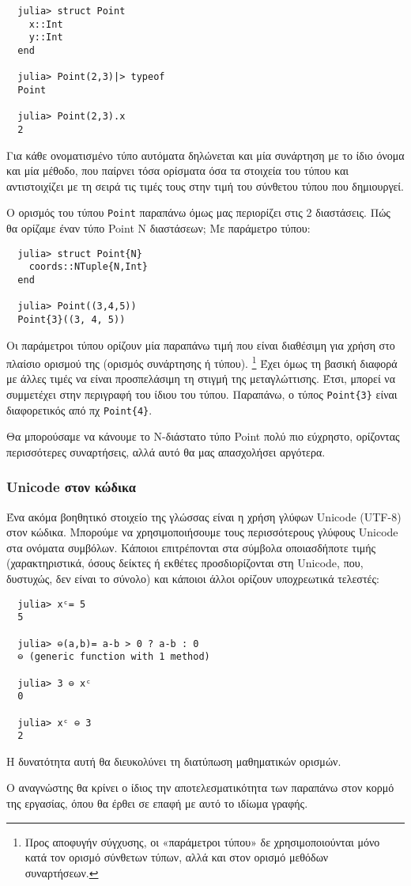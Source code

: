   \begin{verbatim}
  julia> struct Point
    x::Int
    y::Int
  end

  julia> Point(2,3)|> typeof
  Point

  julia> Point(2,3).x
  2
  \end{verbatim}

  Για κάθε ονοματισμένο τύπο αυτόματα δηλώνεται και μία συνάρτηση με το ίδιο όνομα και μία μέθοδο,
  που παίρνει τόσα ορίσματα όσα τα στοιχεία του τύπου και αντιστοιχίζει με τη σειρά τις τιμές τους στην τιμή του σύνθετου τύπου που δημιουργεί.

  Ο ορισμός του τύπου \verb|Point| παραπάνω όμως μας περιορίζει στις 2 διαστάσεις.
  Πώς θα ορίζαμε έναν τύπο Point Ν διαστάσεων; Με παράμετρο τύπου:

  \begin{verbatim}
  julia> struct Point{N}
    coords::NTuple{N,Int}
  end

  julia> Point((3,4,5))
  Point{3}((3, 4, 5))
  \end{verbatim}

  Οι παράμετροι τύπου ορίζουν μία παραπάνω τιμή που είναι διαθέσιμη για χρήση στο πλαίσιο ορισμού της (ορισμός συνάρτησης ή τύπου).
  \footnote{Προς αποφυγήν σύγχυσης, οι «παράμετροι τύπου» δε χρησιμοποιούνται μόνο
  κατά τον ορισμό σύνθετων τύπων, αλλά και στον ορισμό μεθόδων συναρτήσεων.}
  Έχει όμως τη βασική διαφορά με άλλες τιμές να είναι προσπελάσιμη τη στιγμή της μεταγλώττισης.
  Έτσι, μπορεί να συμμετέχει στην περιγραφή του ίδιου του τύπου.
  Παραπάνω, ο τύπος \verb|Point{3}| είναι διαφορετικός από πχ \verb|Point{4}|.

  Θα μπορούσαμε να κάνουμε το Ν-διάστατο τύπο Point πολύ πιο εύχρηστο, ορίζοντας περισσότερες συναρτήσεις,
  αλλά αυτό θα μας απασχολήσει αργότερα.

  \subsubsection{Unicode στον κώδικα}

  Ένα ακόμα βοηθητικό στοιχείο της γλώσσας είναι η χρήση γλύφων Unicode (UTF-8) στον κώδικα.
  Μπορούμε να χρησιμοποιήσουμε τους περισσότερους γλύφους Unicode στα ονόματα συμβόλων.
  Κάποιοι επιτρέπονται στα σύμβολα οποιασδήποτε τιμής (χαρακτηριστικά, όσους δείκτες ή εκθέτες προσδιορίζονται στη Unicode, που, δυστυχώς, δεν είναι το σύνολο)
  και κάποιοι άλλοι ορίζουν υποχρεωτικά τελεστές:

  \begin{verbatim}
  julia> xᶜ= 5
  5

  julia> ⊖(a,b)= a-b > 0 ? a-b : 0
  ⊖ (generic function with 1 method)

  julia> 3 ⊖ xᶜ
  0

  julia> xᶜ ⊖ 3
  2
  \end{verbatim}

  Η δυνατότητα αυτή θα διευκολύνει τη διατύπωση μαθηματικών ορισμών.

  Ο αναγνώστης θα κρίνει ο ίδιος την αποτελεσματικότητα των παραπάνω στον κορμό της εργασίας, όπου θα έρθει σε επαφή με αυτό το ιδίωμα γραφής.
